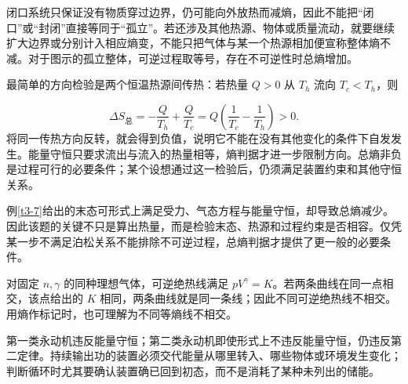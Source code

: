 闭口系统只保证没有物质穿过边界，仍可能向外放热而减熵，因此不能把“闭口”或“封闭”直接等同于“孤立”。若还涉及其他热源、物体或质量流动，就要继续扩大边界或分别计入相应熵变，不能只把气体与某一个热源相加便宣称整体熵不减。对于图示的孤立整体，可逆过程取等号，存在不可逆性时总熵增加。


最简单的方向检验是两个恒温热源间传热：若热量 $Q>0$ 从 $T_h$ 流向 $T_c<T_h$，则

\[
 \Delta S_{\text{总}}=-\frac Q{T_h}+\frac Q{T_c}
 =Q\left(\frac1{T_c}-\frac1{T_h}\right)>0.
\]
将同一传热方向反转，就会得到负值，说明它不能在没有其他变化的条件下自发发生。能量守恒只要求流出与流入的热量相等，熵判据才进一步限制方向。总熵非负是过程可行的必要条件；某个设想通过这一检验后，仍须满足装置约束和其他守恒关系。

例\ref{t3-7}给出的末态可形式上满足受力、气态方程与能量守恒，却导致总熵减少。因此该题的关键不只是算出热量，而是检验末态、热源和过程约束是否相容。仅凭某一步不满足泊松关系不能排除不可逆过程，总熵判据才提供了更一般的必要条件。


对固定 $n,\gamma$ 的同种理想气体，可逆绝热线满足 $pV^\gamma=K$。若两条曲线在同一点相交，该点给出的 $K$ 相同，两条曲线就是同一条线；因此不同可逆绝热线不相交。用熵作标记时，也可理解为不同等熵线不相交。

第一类永动机违反能量守恒；第二类永动机即使形式上不违反能量守恒，仍违反第二定律。持续输出功的装置必须交代能量从哪里转入、哪些物体或环境发生变化；判断循环时尤其要确认装置确已回到初态，而不是消耗了某种未列出的储能。

